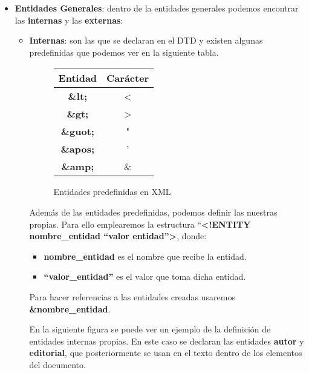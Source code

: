 \begin{itemize}
    \item \textbf{Entidades Generales}: dentro de la entidades generales podemos encontrar las \textbf{internas} y las \textbf{externas}:
    \begin{itemize}
        \item \textbf{Internas}: son las que se declaran  en el DTD y existen algunas predefinidas que podemos ver en la siguiente tabla.

            \begin{figure}[ht]

            \vspace{3ex}
            \centering

            \setlength{\tabcolsep}{10pt}
            \renewcommand{\arraystretch}{1.4}

            \begin{tabular}{| c | c |}
                \hline
                \textbf{Entidad}  & \textbf{Carácter} \\ \hline
                \textbf{\&lt;} &  < \\ \hline
                \textbf{\&gt;} &  > \\ \hline
                \textbf{\&guot;} &  " \\ \hline
                \textbf{\&apos;} &  ' \\ \hline
                \textbf{\&amp;} &  \& \\
                \hline
            \end{tabular}
            \caption{Entidades predefinidas en XML}
        \end{figure}

        Además de las entidades predefinidas, podemos definir las nuestras propias. Para ello emplearemos  la estructura ``\textbf{<!ENTITY nombre\_entidad ``valor entidad''>}, donde:
        \begin{itemize}
            \item \textbf{nombre\_entidad} es el nombre que recibe la entidad.
            \item \textbf{``valor\_entidad''} es el valor que toma dicha entidad.
        \end{itemize}

        Para hacer referencias a las entidades creadas usaremos \textbf{\&nombre\_entidad}.

        En la siguiente figura se puede ver un ejemplo de la definición de entidades internas propias. En este caso se declaran las entidades \textbf{autor} y \textbf{editorial}, que posteriormente se usan en el texto dentro de los elementos del documento.


\end{itemize}
\end{itemize}

